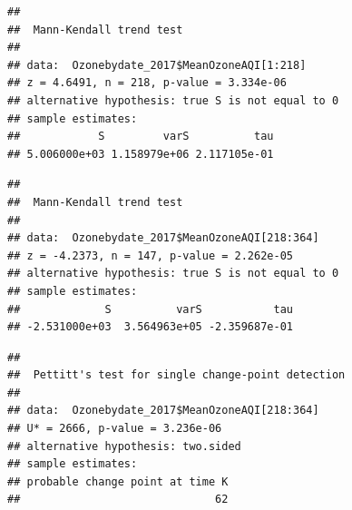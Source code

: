\documentclass[12pt,]{article}
\newenvironment{Shaded}{\begin{snugshade}}{\end{snugshade}}
\newcommand{\KeywordTok}[1]{\textcolor[rgb]{0.13,0.29,0.53}{\textbf{#1}}}
\newcommand{\DecValTok}[1]{\textcolor[rgb]{0.00,0.00,0.81}{#1}}
\newcommand{\CommentTok}[1]{\textcolor[rgb]{0.56,0.35,0.01}{\textit{#1}}}
\newcommand{\OperatorTok}[1]{\textcolor[rgb]{0.81,0.36,0.00}{\textbf{#1}}}
\newcommand{\NormalTok}[1]{#1}
\begin{document}
\begin{Shaded}
\end{Shaded}

\begin{verbatim}
## 
##  Mann-Kendall trend test
## 
## data:  Ozonebydate_2017$MeanOzoneAQI[1:218]
## z = 4.6491, n = 218, p-value = 3.334e-06
## alternative hypothesis: true S is not equal to 0
## sample estimates:
##            S         varS          tau 
## 5.006000e+03 1.158979e+06 2.117105e-01
\end{verbatim}

\begin{Shaded}
\end{Shaded}

\begin{verbatim}
## 
##  Mann-Kendall trend test
## 
## data:  Ozonebydate_2017$MeanOzoneAQI[218:364]
## z = -4.2373, n = 147, p-value = 2.262e-05
## alternative hypothesis: true S is not equal to 0
## sample estimates:
##             S          varS           tau 
## -2.531000e+03  3.564963e+05 -2.359687e-01
\end{verbatim}

\begin{Shaded}
\end{Shaded}

\begin{verbatim}
## 
##  Pettitt's test for single change-point detection
## 
## data:  Ozonebydate_2017$MeanOzoneAQI[218:364]
## U* = 2666, p-value = 3.236e-06
## alternative hypothesis: two.sided
## sample estimates:
## probable change point at time K 
##                              62
\end{verbatim}
\end{document}
